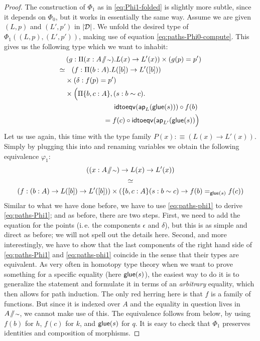 \begin{proof}
The construction of $\Phi_1$ as in \eqref{eq:Phi1-folded} is slightly
more subtle, since it depends on $\Phi_0$, but it works in essentially the same way.
Assume we are given $(L, p)$ and $(L', p')$ in $\mathopen{}\left|\mathcal D\right|_{}^{}\mathclose{}$.
We unfold the desired type of $\Phi_1((L,p),(L',p'))$, making use of
equation \eqref{eq:paths-Phi0-compute}.
This gives us the following type which we want to inhabit:
 \begin{equation} \label{eq:paths-Phi1}
  \begin{alignedat}{2}
   &&& \left(g : \Pi(x : A \! \sslash \! {\scriptstyle \sim}). L(x) \to L'(x)\right) \times \left(g(p) = p'\right) \\
   \simeq &&& \phantom{\times} \left(f : \Pi(b : A). L([b]) \to L'([b])  \right) \\
           &&& \times (\delta: f(p) = p') \\
           &&& \times \Bigl( \Pi\{b,c : A\},(s : b \sim c). \\
           &&& \phantom{=========} \mathsf{idtoeqv}(\mathsf{ap}_L(\mathsf{glue}(s))) \circ f(b)  \\
           &&& \phantom{=======} = f(c) \circ \mathsf{idtoeqv}(\mathsf{ap}_{L'}(\mathsf{glue}(s)) \Bigr)
  \end{alignedat}
 \end{equation}
Let us use  again, this time with the
type family $P(x) :\equiv (L(x) \to L'(x))$.
Simply by plugging this into  and renaming variables
we obtain the following equivalence $\varphi_1$:
\begin{equation}\label{eq:paths-phi1}
\begin{gathered}
((x : A \! \sslash \! {\scriptstyle \sim}) \to L(x) \to L'(x)) \\
\simeq \\
(f : (b : A) \to L([b]) \to L'([b])) \times (\{b, c : A\}(s : b \sim c) \to f(b) =_{\mathsf{glue}(s)} f(c))
\end{gathered}
\end{equation}
Similar to what we have done before, we have to use \eqref{eq:paths-phi1}
to derive \eqref{eq:paths-Phi1};
and as before, there are two steps.
First, we need to add the equation for the points (i.\,e. the components $\epsilon$
and $\delta$), but this is as simple and direct as before; we will not spell
out the details here.
Second, and more interestingly, we have to show that the last components of
the right hand side of
\eqref{eq:paths-Phi1} and \eqref{eq:paths-phi1} coincide in the sense
that their types are equivalent.
As very often in homotopy type theory when we want to prove something for
a specific equality (here $\mathsf{glue}(s)$), the easiest way to do it is to
generalize the statement and formulate it in terms of an \emph{arbitrary}
equality,
which then allows for path induction.
The only red herring here is that $f$ is a family of functions.
But since it is indexed over $A$ and the equality in question lives in $A \! \sslash \! {\scriptstyle \sim}$,
we cannot make use of this.
The equivalence follows from  below,
by using $f(b)$ for $h$, $f(c)$ for $k$, and $\mathsf{glue}(s)$ for $q$.
It is easy to check that $\Phi_1$ preserves identities and composition of
morphisms.
\end{proof}

